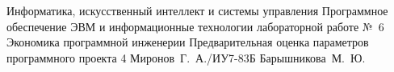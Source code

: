 \documentclass{bmstu}
\begin{document}
\makereporttitle
    {Информатика, искусственный интеллект и системы управления}
    {Программное обеспечение ЭВМ и информационные технологии}
    {лабораторной работе №~6}
    {Экономика программной инженерии}
    {Предварительная оценка параметров программного проекта}
    {4}
    {Миронов~Г.~А./ИУ7-83Б}
    {Барышникова~М.~Ю.}






\end{document}
